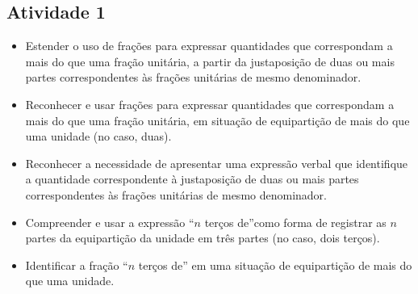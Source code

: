 \begin{multicols}{2}


\subsection{Atividade 1}

   \vspace{.1cm}

  \begin{itemize} %
    \item       Estender o uso de frações para expressar quantidades que correspondam a mais do que uma fração unitária, a partir da justaposição de duas ou mais partes correspondentes às frações unitárias de mesmo denominador.
    \item       Reconhecer e usar frações para expressar quantidades que correspondam a mais do que uma fração unitária, em situação de equipartição de mais do que uma unidade (no caso, duas).
    \item       Reconhecer a necessidade de apresentar uma expressão verbal que identifique a quantidade correspondente à justaposição de duas ou mais partes correspondentes às frações unitárias de mesmo denominador.
    \item       Compreender e usar a expressão ``$n$ terços de''como forma de registrar as $n$ partes da equipartição da unidade em três partes (no caso, dois terços).
    \item       Identificar a fração ``$n$ terços de'' em uma situação de equipartição de mais do que uma unidade.
\end{itemize} %


  \vspace{.1cm}

  \vspace{.1cm}


\end{multicols}
